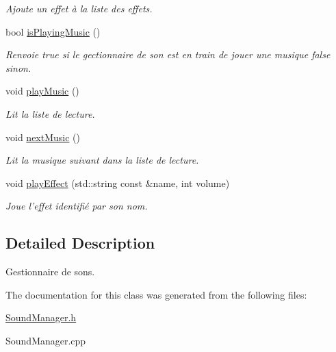 \begin{DoxyCompactItemize}
\begin{DoxyCompactList}\small\item\em Ajoute un effet à la liste des effets. \end{DoxyCompactList}\item 
\hypertarget{classSoundManager_a43c79a5278a1c423a463eda0c80b8c11}{bool \hyperlink{classSoundManager_a43c79a5278a1c423a463eda0c80b8c11}{is\-Playing\-Music} ()}\label{classSoundManager_a43c79a5278a1c423a463eda0c80b8c11}

\begin{DoxyCompactList}\small\item\em Renvoie true si le gectionnaire de son est en train de jouer une musique false sinon. \end{DoxyCompactList}\item 
\hypertarget{classSoundManager_a22b283e46295d90a28b97df7923f2999}{void \hyperlink{classSoundManager_a22b283e46295d90a28b97df7923f2999}{play\-Music} ()}\label{classSoundManager_a22b283e46295d90a28b97df7923f2999}

\begin{DoxyCompactList}\small\item\em Lit la liste de lecture. \end{DoxyCompactList}\item 
\hypertarget{classSoundManager_aa78ebda8e0a1a06b87d405eda32fa21a}{void \hyperlink{classSoundManager_aa78ebda8e0a1a06b87d405eda32fa21a}{next\-Music} ()}\label{classSoundManager_aa78ebda8e0a1a06b87d405eda32fa21a}

\begin{DoxyCompactList}\small\item\em Lit la musique suivant dans la liste de lecture. \end{DoxyCompactList}\item 
\hypertarget{classSoundManager_a5ae512c899d6cf2e818a0c12e7f74b06}{void \hyperlink{classSoundManager_a5ae512c899d6cf2e818a0c12e7f74b06}{play\-Effect} (std\-::string const \&name, int volume)}\label{classSoundManager_a5ae512c899d6cf2e818a0c12e7f74b06}

\begin{DoxyCompactList}\small\item\em Joue l'effet identifié par son nom. \end{DoxyCompactList}\end{DoxyCompactItemize}


\subsection{Detailed Description}
Gestionnaire de sons. 

The documentation for this class was generated from the following files\-:\begin{DoxyCompactItemize}
\item 
\hyperlink{SoundManager_8h}{Sound\-Manager.\-h}\item 
Sound\-Manager.\-cpp\end{DoxyCompactItemize}
